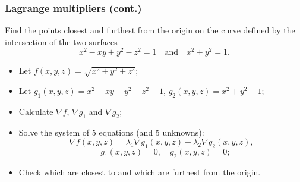 \documentclass[aspectratio=169,handout]{beamer}
\begin{document}
\begin{frame}
    \frametitle{Lagrange multipliers (cont.)}

    \begin{example}
        Find the points closest and furthest from the origin on the curve defined by the intersection of the two surfaces
        \[
            x^2 - xy + y^2 - z^2 = 1
            \quad \text{and} \quad
            x^2 + y^2 = 1.
        \]
        \vspace{-1em}
        \begin{itemize}
            \item Let \(f(x,y,z) = \sqrt{x^2 + y^2 + z^2}\);
            \item Let \(g_1(x,y,z) = x^2 - xy + y^2 - z^2 - 1\),
                  \(g_2(x,y,z) = x^2 + y^2 - 1\);
            \item Calculate \(\nabla f\), \(\nabla g_1\) and \(\nabla g_2\);
            \item Solve the system of 5 equations (and 5 unknowns):
                  \vspace{-1em}
                  \[
                      \nabla f (x,y,z) = \lambda_1 \nabla g_1(x,y,z)  + \lambda_2 \nabla g_2(x,y,z),
                  \]
                  \[
                      \quad g_1(x,y,z) =0,
                      \quad g_2(x,y,z) =0;
                  \]
            \item Check which are closest to and which are furthest from the origin.
        \end{itemize}
    \end{example}


\end{frame}
\end{document}
